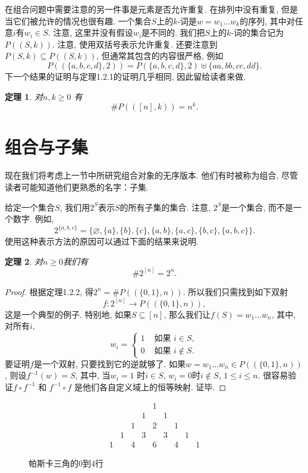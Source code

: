 \documentclass{ctexbook}
\newtheorem{thm}{定理}[section]
\begin{document}
在组合问题中需要注意的另一件事是元素是否允许重复. 在排列中没有重复, 但是当它们被允许的情况也很有趣.
一个集合$S$上的$k$-词是$w=w_{1} \ldots w_{k}$的序列, 其中对任意$i$有$w_{i} \in S$. 注意, 这里并没有假设$w_{i}$是不同的.
我们把$S$上的$k$-词的集合记为$P((S, k))$. 注意, 使用双括号表示允许重复. 还要注意到$P(S, k) \subseteq P((S, k))$,
但通常其包含的内容很严格, 例如
$$P((\{a, b, c, d\}, 2))=P(\{a, b, c, d\}, 2) \uplus\{a a, b b, c c, d d\}.$$
下一个结果的证明与定理1.2.1的证明几乎相同, 因此留给读者来做.
    \begin{thm}
    	\textsl{对}$n, k \geqslant 0$ \textsl{有}
    		$$\# P(([n], k))=n^{k}.$$
    \end{thm}

\section{组合与子集}
现在我们将考虑上一节中所研究组合对象的无序版本. 他们有时被称为组合, 尽管读者可能知道他们更熟悉的名字：子集.

给定一个集合$S$, 我们用$2^{S}$表示$S$的所有子集的集合. 注意, $2^{S}$是一个集合, 而不是一个数字. 例如,
$$2^{\{a, b, c\}}=\{\varnothing,\{a\},\{b\},\{c\},\{a, b\},\{a, c\},\{b, c\},\{a, b, c\}\}.$$
使用这种表示方法的原因可以通过下面的结果来说明.
     \begin{thm}
     	\textsl{对}$n \geqslant 0$\textsl{我们有}
     		$$\# 2^{[n]}=2^{n}.$$
     \end{thm}
     \begin{proof}
     	根据定理1.2.2, 得$2^{n}=\# P((\{0,1\}, n))$. 所以我们只需找到如下双射
     	$$f: 2^{[n]} \rightarrow P((\{0,1\}, n)),$$
     	这是一个典型的例子. 特别地, 如果$S \subseteq[n]$, 那么我们让$f(S)=w_{1} \ldots w_{n}$, 其中, 对所有$i$,
     	$$
     	w_{i}=\left\{\begin{array}{ll}
     	1 & \text { 如果\ } i \in S,\\
     	0 & \text { 如果\ } i \notin S.
     	\end{array}\right.
     	$$
     	要证明$f$是一个双射, 只要找到它的逆就够了. 如果$w=w_{1} \ldots w_{n} \in P((\{0,1\}, n))$, 则设$f^{-1}(w)=S$, 其中, 当$w_{i}=1$
     	时$i \in S$, $w_{i}=0$时$i \notin S$, $1 \leqslant i \leqslant n $. 很容易验证$f \circ f^{-1}$ 和 $f^{-1} \circ f$
     	是他们各自定义域上的恒等映射. 证毕.
     \end{proof}




\begin{figure}
    \centering
$$\begin{array}{ccccccccccccc}
    & & & & 1 & & & & \\
    & & & 1 & & 1 & & & \\
    & & 1 & & 2 & & 1 & & \\
    & 1 & & 3 & & 3 & & 1 & \\
    1 & & 4 & & 6 & & 4 & & 1
\end{array}$$
    \caption{ 帕斯卡三角的0到4行}
\end{figure}
\end{document}
